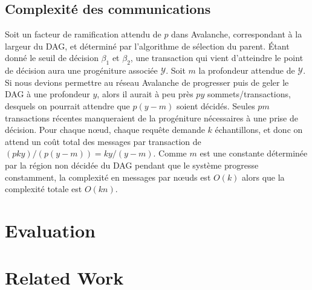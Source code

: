 \documentclass[letterpaper,twocolumn,10pt]{article}
\theoremstyle{definition}
\begin{document}
\subsection{Complexité des communications}
Soit un facteur de ramification attendu de $p$ dans Avalanche, correspondant à la largeur du DAG, et déterminé par l'algorithme de sélection du parent.
Étant donné le seuil de décision $\beta_1$ et $\beta_2$, une transaction qui vient d'atteindre le point de décision aura une progéniture associée $\mathcal{Y}$.
Soit $m$ la profondeur attendue de $\mathcal{Y}$.
Si nous devions permettre au réseau Avalanche de progresser puis de geler le DAG à une profondeur $y$, alors il aurait à peu près $py$ sommets/transactions, desquels on pourrait attendre que $p(y - m)$ soient décidés.
Seules $pm$ transactions récentes manqueraient de la progéniture nécessaires à une prise de décision.
Pour chaque nœud, chaque requête demande $k$ échantillons, et donc on attend un coût total des messages par transaction de $(pky) / (p(y - m)) = ky/(y-m)$.
Comme $m$ est une constante déterminée par la région non décidée du DAG pendant que le système progresse constamment, la complexité en messages par nœuds est $O(k)$ alors que la complexité totale est $O(kn)$.

\section{Evaluation}
\label{sec:evaluation}


\section{Related Work}
\label{sec:related-work}

\end{document}
